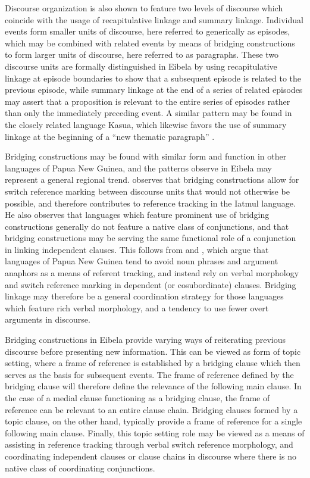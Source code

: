 \documentclass[output=paper]{LSP/langsci}
\begin{document}
Discourse organization is also shown to feature two levels of discourse which coincide with the usage of recapitulative linkage and summary linkage. Individual events form smaller units of discourse, here referred to generically as episodes, which may be combined with related events by means of bridging constructions to form larger units of discourse, here referred to as paragraphs. These two discourse units are formally distinguished in Eibela by using recapitulative linkage at episode boundaries to show that a subsequent episode is related to the previous episode, while summary linkage at the end of a series of related episodes may assert that a proposition is relevant to the entire series of episodes rather than only the immediately preceding event. A similar pattern may be found in the closely related language Kasua, which likewise favors the use of summary linkage at the beginning of a ``new thematic paragraph'' \citep[][24]{logan08}.

Bridging constructions may be found with similar form and function in other languages of Papua New Guinea, and the patterns observe in Eibela may represent a general regional trend. \citet[][]{Jendraschek09} observes that bridging constructions allow for switch reference marking between discourse units that would not otherwise be possible, and therefore contributes to reference tracking in the Iatmul language. He also observes that languages which feature prominent use of bridging constructions generally do not feature a native class of conjunctions, and that bridging constructions may be serving the same functional role of a conjunction in linking independent clauses. This follows from \citet[][367]{devries.2005} and \citet[][374--375]{longacre07}, which argue that languages of Papua New Guinea tend to avoid noun phrases and argument anaphors as a means of referent tracking, and instead rely on verbal morphology and switch reference marking in dependent (or cosubordinate) clauses. Bridging linkage may therefore be a general coordination strategy for those languages which feature rich verbal morphology, and a tendency to use fewer overt arguments in discourse.

Bridging constructions in Eibela provide varying ways of reiterating previous discourse before presenting new information. This can be viewed as form of topic setting, where a frame of reference is established by a bridging clause which then serves as the basis for subsequent events. The frame of reference defined by the bridging clause will therefore define the relevance of the following main clause. In the case of a medial clause functioning as a bridging clause, the frame of reference can be relevant to an entire clause chain. Bridging clauses formed by a topic clause, on the other hand, typically provide a frame of reference for a single following main clause. Finally, this topic setting role may be viewed as a means of assisting in reference tracking through verbal switch reference morphology, and coordinating independent clauses or clause chains in discourse where there is no native class of coordinating conjunctions.
\end{document}
